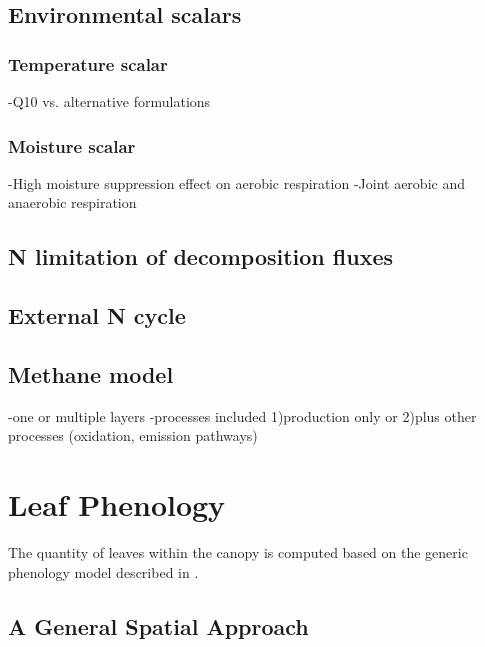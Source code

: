 \documentclass[twoside,10pt]{report}
\begin{document}
\subsection{Environmental scalars}

\subsubsection{Temperature scalar}

-Q10 vs. alternative formulations

\subsubsection{Moisture scalar}
-High moisture suppression effect on aerobic respiration
-Joint aerobic and anaerobic respiration

\subsection{N limitation of decomposition fluxes}
\subsection{External N cycle}
\subsection{Methane model}
-one or multiple layers
-processes included 1)production only or 2)plus other processes (oxidation, emission pathways)

\section{Leaf Phenology}

The quantity of leaves within the canopy is computed based on the generic phenology model described in \citet{Knorr2010}. 

\subsection{A General Spatial Approach}
\end{document}
